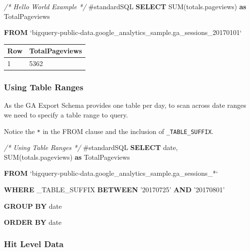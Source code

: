 \documentclass[]{book}
\newenvironment{Shaded}{\begin{snugshade}}{\end{snugshade}}
\newcommand{\KeywordTok}[1]{\textcolor[rgb]{0.13,0.29,0.53}{\textbf{#1}}}
\newcommand{\DataTypeTok}[1]{\textcolor[rgb]{0.13,0.29,0.53}{#1}}
\newcommand{\StringTok}[1]{\textcolor[rgb]{0.31,0.60,0.02}{#1}}
\newcommand{\CommentTok}[1]{\textcolor[rgb]{0.56,0.35,0.01}{\textit{#1}}}
\newcommand{\FunctionTok}[1]{\textcolor[rgb]{0.00,0.00,0.00}{#1}}
\newcommand{\NormalTok}[1]{#1}
\begin{document}
\begin{Shaded}
\begin{Highlighting}[]
\CommentTok{/* Hello World Example */}
\NormalTok{#standardSQL}
\KeywordTok{SELECT} \FunctionTok{SUM}\NormalTok{(totals.pageviews) }\KeywordTok{as}\NormalTok{ TotalPageviews}
    
\KeywordTok{FROM}\NormalTok{ `bigquery-public-data.google_analytics_sample.ga_sessions_20170101`}
\end{Highlighting}
\end{Shaded}

\begin{longtable}[]{@{}ll@{}}
\toprule
Row & TotalPageviews\tabularnewline
\midrule
\endhead
1 & 5362\tabularnewline
\bottomrule
\end{longtable}

\subsubsection{Using Table Ranges}\label{using-table-ranges}

As the GA Export Schema provides one table per day, to scan across date
ranges we need to specify a table range to query.

Notice the \texttt{*} in the FROM clause and the inclusion of
\texttt{\_TABLE\_SUFFIX}.

\begin{Shaded}
\begin{Highlighting}[]
\CommentTok{/* Using Table Ranges */}
\NormalTok{#standardSQL}
\KeywordTok{SELECT}  \DataTypeTok{date}\NormalTok{, }
        \FunctionTok{SUM}\NormalTok{(totals.pageviews) }\KeywordTok{as}\NormalTok{ TotalPageviews}

\KeywordTok{FROM}\NormalTok{  `bigquery-public-data.google_analytics_sample.ga_sessions_*`}

\KeywordTok{WHERE}\NormalTok{ _TABLE_SUFFIX }\KeywordTok{BETWEEN} \StringTok{'20170725'} \KeywordTok{AND} \StringTok{'20170801'}

\KeywordTok{GROUP} \KeywordTok{BY} \DataTypeTok{date}

\KeywordTok{ORDER} \KeywordTok{BY} \DataTypeTok{date}
\end{Highlighting}
\end{Shaded}

\subsubsection{Hit Level Data}\label{hit-level-data}
\end{document}
